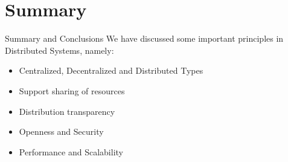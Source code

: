 \section{Summary}

\begin{slide}{Summary and Conclusions}
We have discussed some important principles
in Distributed Systems, namely:
\begin{itemize}
  \item Centralized, Decentralized and Distributed Types
  \item Support sharing of resources
  \item Distribution transparency
  \item Openness and Security
  \item Performance and Scalability
\end{itemize}  
\end{slide}
